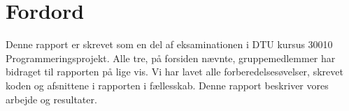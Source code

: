\chapter{Fordord}

Denne rapport er skrevet som en del af eksaminationen i DTU kursus 30010 Programmeringsprojekt. Alle tre, på forsiden nævnte, gruppemedlemmer har bidraget til rapporten på lige vis. Vi har lavet alle forberedelsesøvelser, skrevet koden og afsnittene i rapporten i fællesskab. Denne rapport beskriver vores arbejde og resultater.

